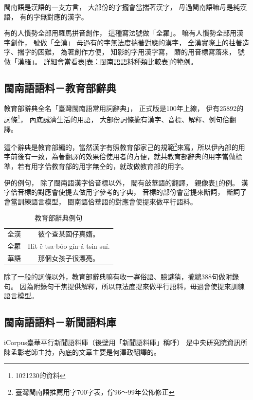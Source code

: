 閩南語是漢語的一支方言，
大部份的字攏會當揣著漢字，
毋過閩南語嘛毋是純漢語，
有的字無對應的漢字。

有的人慣勢全部用羅馬拼音創作，
這種寫法號做「全羅」。
嘛有人慣勢全部用漢字創作，
號做「全漢」
毋過有的字無法度揣著對應的漢字，
全漢實際上的拄著造字、揣字的困難，
為著創作方便，
知影的字用漢字寫，
賰的用音標寫落來，
號做「漢羅」。
詳細會當看表\ref{表：閩南語語料種類比較表}的範例。

\subsection{閩南語語料－教育部辭典}
\label{節：教育部辭典}
教育部辭典全名「臺灣閩南語常用詞辭典」\cite{教育部臺灣閩南語常用詞辭典}，
正式版是100年上線，
伊有25892的詞條\footnote{1021230的資料}，
內底誠濟生活的用語，
大部份詞條攏有漢字、音標、解釋、例句佮翻譯。

這个辭典是教育部編的，當然漢字有照教育部家己的規範\footnote{臺灣閩南語推薦用字700字表，佇96～99年公佈修正}來寫，所以伊內部的用字前後有一致，為著翻譯的效果佮使用者的方便，就共教育部辭典的用字當做標準，若有用字佮教育部的用字無仝的，就改做教育部的用字。%

伊的例句，
除了閩南語漢字佮音標以外，
閣有敆華語的翻譯，
親像表\ref{表：教育部辭典例句}的例。
漢字佮音標的對應會使提去做用字參考的字典，
音標的部份會當提來斷詞，
斷詞了會當訓練語言模型，
閩南語佮華語的對應會使提來做平行語料。

\begin{table}
\caption{教育部辭典例句}
\label{表：教育部辭典例句}
\centering
\begin{tabular}{c|c}
全漢 & 彼个查某囡仔真媠。 \\
全羅 & Hit ê tsa-bóo gín-á tsin suí.\\
華語 & 那個女孩子很漂亮。\\
\end{tabular}
\end{table}

除了一般的詞條以外，教育部辭典嘛有收一寡俗語、臆謎猜，攏總388句做附錄句。
因為附錄句干焦提供解釋，所以無法度提來做平行語料，毋過會使提來訓練語言模型。


\subsection{閩南語語料－新聞語料庫}
\label{節：新聞語料庫}
iCorpus臺華平行新聞語料庫（後壁用「新聞語料庫」稱呼）\cite{iCorpus臺華平行新聞語料庫}
是中央研究院資訊所陳孟彰老師主持，內底的文章主要是何澤政翻譯的。

